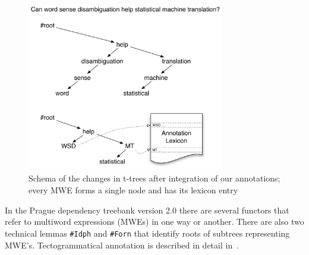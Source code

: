 \begin{figure}[htbp]
   \centering
   \includegraphics[width=3.4in]{images/stromecky.pdf}
   \caption{Schema of the changes in t-trees after integration of our annotations; every MWE forms a single node and has its lexicon entry}
   \label{fig:trees}
\end{figure}


In the Prague dependency treebank version 2.0 \citep{pdt2:2006} there are several functors that refer to multiword expressions (MWEs) in one way or another. There are also two technical lemmas \texttt{\#Idph} and \texttt{\#Forn} that identify roots of subtrees representing MWE's. Tectogrammatical annotation is described in detail in~\citet{mikulova:2006}.



